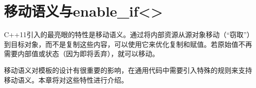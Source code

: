 \chapter{移动语义与enable\_if<>}
C++11引入的最亮眼的特性是移动语义。通过将内部资源从源对象移动（“窃取”）到目标对象，而不是复制这些内容，可以使用它来优化复制和赋值。若原始值不再需要内部值或状态（因为即将丢弃），就可以移动。

移动语义对模板的设计有很重要的影响，在通用代码中需要引入特殊的规则来支持移动语义。本章将对这些特性进行介绍。





